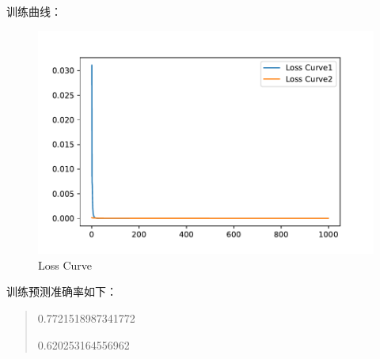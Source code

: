 \documentclass[UTF8,a4paper,AutoFakeBold,AutoFakeSlant]{article}
\begin{document}
训练曲线：
\begin{figure}[htbp]
  \centering
  \includegraphics[scale=0.625]{loss.pdf}
  \caption{Loss Curve}
  \label{f1}
\end{figure}

训练预测准确率如下：
\begin{quotation}
  0.7721518987341772

  0.620253164556962
\end{quotation}



















% 
% 
% 
\end{document}
